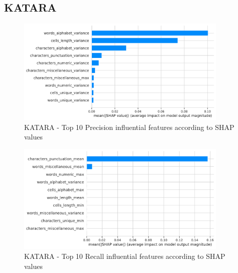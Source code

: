 \subsection{KATARA}
\begin{figure}[H]
    \centering
    \includegraphics[width=0.9\textwidth]{thesis/Figures/RQ4/Shap_cell_prec_KATARA.pdf}
    \caption{KATARA - Top 10 Precision influential features according to SHAP values}
    \label{fig:feature_importance_prec_KATARA}
\end{figure}
\begin{figure}[H]
    \centering
    \includegraphics[width=0.9\textwidth]{thesis/Figures/RQ4/Shap_cell_rec_KATARA.pdf}
    \caption{KATARA - Top 10 Recall influential features according to SHAP values}
    \label{fig:feature_importance_rec_KATARA}
\end{figure}


